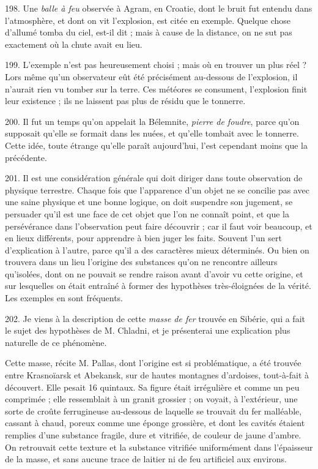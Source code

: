 \documentclass[a4paper, 11pt, oneside, polutonikogreek, french]{article}
\begin{document}
198. Une \emph{balle à feu} observée à Agram, en Croatie, dont le bruit fut entendu dans l'atmosphère, et dont on vit l'explosion, est citée en exemple. Quelque chose d'allumé tomba du ciel, est-il dit ; mais à cause de la distance, on ne sut pas exactement où la chute avait eu lieu.

199. L'exemple n'est pas heureusement choisi ; mais où en trouver un plus réel ? Lors même qu'un observateur eût été précisément au-dessous de l'explosion, il n'aurait rien vu tomber sur la terre. Ces météores se consument, l'explosion finit leur existence ; ils ne laissent pas plus de résidu que le tonnerre.

200. Il fut un temps qu'on appelait la Bélemnite, \emph{pierre de foudre}, parce qu'on supposait qu'elle se formait dans les nuées, et qu'elle tombait avec le tonnerre. Cette idée, toute étrange qu'elle paraît aujourd'hui, l'est cependant moins que la précédente.

201. Il est une considération générale qui doit diriger dans toute observation de physique terrestre. Chaque fois que l'apparence d'un objet ne se concilie pas avec une saine physique et une bonne logique, on doit suspendre son jugement, se persuader qu'il est une face de cet objet que l'on ne connaît point, et que la persévérance dans l'observation peut faire découvrir ; car il faut voir beaucoup, et en lieux différents, pour apprendre à bien juger les faits. Souvent l'un sert d'explication à l'autre, parce qu'il a des caractères mieux déterminés. Ou bien on trouvera dans un lieu l'origine des substances qu'on ne rencontre ailleurs qu'isolées, dont on ne pouvait se rendre raison avant d'avoir vu cette origine, et sur lesquelles on était entraîné à former des hypothèses très-éloignées de la vérité. Les exemples en sont fréquents.

202. Je viens à la description de cette \emph{masse de fer} trouvée en Sibérie, qui a fait le sujet des hypothèses de M. Chladni, et je présenterai une explication plus naturelle de ce phénomène.

\og Cette masse, récite M. Pallas, dont l'origine est si problématique, a été trouvée entre Krasnoïarsk et Abekansk, sur de hautes montagnes d'ardoises, tout-à-fait à découvert. Elle pesait 16 quintaux. Sa figure était irrégulière et comme un peu comprimée ; elle ressemblait à un granit grossier ; on voyait, à l'extérieur, une sorte de croûte ferrugineuse au-dessous de laquelle se trouvait du fer malléable, cassant à chaud, poreux comme une éponge grossière, et dont les cavités étaient remplies d'une substance fragile, dure et vitrifiée, de couleur de jaune d'ambre. On retrouvait cette texture et la substance vitrifiée uniformément dans l'épaisseur de la masse, et sans aucune trace de laitier ni de feu artificiel aux environs. \fg
\end{document}
